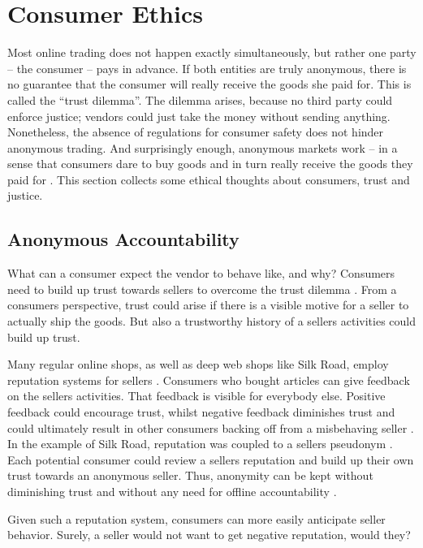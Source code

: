 \section{Consumer Ethics}
\label{consumers}

Most online trading does not happen exactly simultaneously, but rather one party -- the consumer -- pays in advance. If both entities are truly anonymous, there is no guarantee that the consumer will really receive the goods she paid for. This is called the ``trust dilemma''\cite{internetTrust2004}. The dilemma arises, because no third party could enforce justice; vendors could just take the money without sending anything. Nonetheless, the absence of regulations for consumer safety does not hinder anonymous trading. And surprisingly enough, anonymous markets work -- in a sense that consumers dare to buy goods and in turn really receive the goods they paid for \cite{silkroad2013}. This section collects some ethical thoughts about consumers, trust and justice.

\subsection{Anonymous Accountability}

What can a consumer expect the vendor to behave like, and why? Consumers need to build up trust towards sellers to overcome the trust dilemma \cite{internetTrust2004}. From a consumers perspective, trust could arise if there is a visible motive for a seller to actually ship the goods. But also a trustworthy history of a sellers activities could build up trust.

Many regular online shops, as well as deep web shops like Silk Road, employ reputation systems for sellers \cite{internetTrust2004, silkroad2013}. Consumers who bought articles can give feedback on the sellers activities. That feedback is visible for everybody else. Positive feedback could encourage trust, whilst negative feedback diminishes trust and could ultimately result in other consumers backing off from a misbehaving seller \cite{internetTrust2004}. In the example of Silk Road, reputation was coupled to a sellers pseudonym \cite{silkroad2013}. Each potential consumer could review a sellers reputation and build up their own trust towards an anonymous seller. Thus, anonymity can be kept without diminishing trust and without any need for offline accountability \cite{internetTrust2004, accountability2014}.

Given such a reputation system, consumers can more easily anticipate seller behavior. Surely, a seller would not want to get negative reputation, would they?


